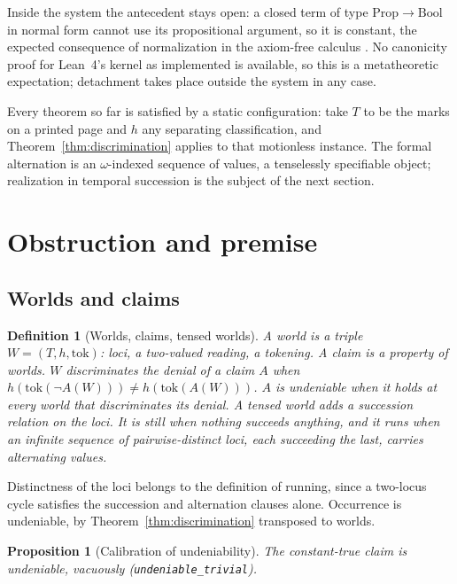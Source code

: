 \documentclass[11pt]{article}
\newtheorem{proposition}[theorem]{Proposition}
\newtheorem{definition}[theorem]{Definition}
\newcommand{\lf}[1]{\texttt{#1}}
\begin{document}
Inside the system the antecedent stays open: a closed term of type $\mathrm{Prop} \to \mathrm{Bool}$ in normal form cannot use its propositional argument, so it is constant, the expected consequence of normalization in the axiom-free calculus \cite{carneiro2019}. No canonicity proof for Lean~4's kernel as implemented is available, so this is a metatheoretic expectation; detachment takes place outside the system in any case.

Every theorem so far is satisfied by a static configuration: take $T$ to be the marks on a printed page and $h$ any separating classification, and Theorem~\ref{thm:discrimination} applies to that motionless instance. The formal alternation is an $\omega$-indexed sequence of values, a tenselessly specifiable object; realization in temporal succession is the subject of the next section.

\section{Obstruction and premise}
\label{sec:obstruction}

\subsection{Worlds and claims}

\begin{definition}[Worlds, claims, tensed worlds]
\label{def:world}
A \emph{world} is a triple $W = (T, h, \mathrm{tok})$: loci, a two-valued reading, a tokening. A \emph{claim} is a property of worlds. $W$ \emph{discriminates the denial} of a claim $A$ when $h(\mathrm{tok}(\lnot A(W))) \neq h(\mathrm{tok}(A(W)))$. $A$ is \emph{undeniable} when it holds at every world that discriminates its denial. A \emph{tensed world} adds a succession relation on the loci. It is \emph{still} when nothing succeeds anything, and it \emph{runs} when an infinite sequence of pairwise-distinct loci, each succeeding the last, carries alternating values.
\end{definition}

Distinctness of the loci belongs to the definition of running, since a two-locus cycle satisfies the succession and alternation clauses alone. Occurrence is undeniable, by Theorem~\ref{thm:discrimination} transposed to worlds.

\begin{proposition}[Calibration of undeniability]
\label{prop:undeniableweak}
The constant-true claim is undeniable, vacuously (\lf{undeniable\_trivial}).
\end{proposition}
\end{document}
